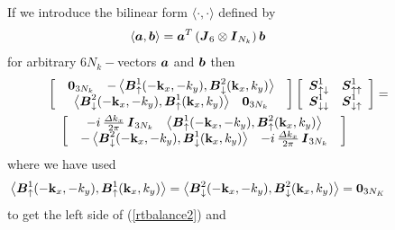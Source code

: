 \begin{figure}
{\begin{minipage} {140.0mm}
If we introduce the bilinear form $\langle \cdot, \cdot \rangle$ defined by
\[
\langle {\mbox{\boldmath$\mit a$\unboldmath}}, {\mbox{\boldmath$\mit b$\unboldmath}} \rangle= {\mbox{\boldmath$\mit a$\unboldmath}}^{T}\left({\mbox{\boldmath$\mit J$\unboldmath}}_6 \otimes 
{\mbox{\boldmath$\mit I$\unboldmath}}_{N_k}  \right) {\mbox{\boldmath$\mit b$\unboldmath}}
\]
for arbitrary $6 N_k-$vectors ${\mbox{\boldmath$\mit a$\unboldmath}}$ and  ${\mbox{\boldmath$\mit b$\unboldmath}}$ then
\begin{eqnarray} \label{rtbalance2}
\lefteqn{\left[{\begin{array}{c}\begin{array}{cc}{\bf 
0}_{3{N}_{k}}&-\left\langle{{\bmi B}_{ \uparrow }^{1}(-{\bf 
k}_{x},-{k}_{y}),{\bmi B}_{ \downarrow }^{2}({\bf 
k}_{x},{k}_{y})}\right\rangle\end{array}\\ 
\begin{array}{cc}\left\langle{{\bmi B}_{ \downarrow }^{2}(-{\bf 
k}_{x},-{k}_{y}),{\bmi B}_{ \uparrow }^{1}({\bf 
k}_{x},{k}_{y})}\right\rangle&{\bf 
0}_{3{N}_{k}}\end{array}\end{array}}\right]\left[{\begin{array}{cc}{\bmi 
S}^{1}_{ \uparrow \downarrow }&{\bmi S}^{1}_{ \uparrow \uparrow }\\ {\bmi S}^{1}_{ 
\downarrow \downarrow }&{\bmi S}^{1}_{ \downarrow \uparrow 
}\end{array}}\right]=}\nonumber\\
&&
\left[{\begin{array}{c}\begin{array}{cc}-i\,\frac{{\mit \Delta}k_x}{2 
\pi}\,{\bmi 
I}_{3{N}_{k}}&\left\langle{{\bmi B}_{ \uparrow }^{1}(-{\bf 
k}_{x},-{k}_{y}),{\bmi B}_{ \uparrow }^{2}({\bf 
k}_{x},{k}_{y})}\right\rangle\end{array}\\ 
\begin{array}{cc}-\left\langle{{\bmi B}_{ \downarrow }^{2}(-{\bf 
k}_{x},-{k}_{y}),{\bmi B}_{ \downarrow }^{1}({\bf 
k}_{x},{k}_{y})}\right\rangle&-i\,\frac{{\mit \Delta}k_x}{2 \pi}\,{\bmi 
I}_{3{N}_{k}}\end{array}\end{array}}\right] 
\end{eqnarray} 
where we have used
\[
\left\langle{{\mbox{\boldmath$\mit B$\unboldmath}}_{ \uparrow }^{1}(-{\bf k}_{x},-{k}_{y}),{\mbox{\boldmath$\mit B$\unboldmath}}_{ \uparrow 
}^{1}({\bf k}_{x},{k}_{y})}\right\rangle=\left\langle{{\mbox{\boldmath$\mit B$\unboldmath}}_{ \downarrow 
}^{2}(-{\bf k}_{x},-{k}_{y}),{\mbox{\boldmath$\mit B$\unboldmath}}_{ \downarrow 
}^{2}({\bf k}_{x},{k}_{y})}\right\rangle={\bf 0}_{3{N}_{K}}
\] 
to get the left side of (\ref{rtbalance2}) and

\vspace{6mm}
\end{minipage}
}
\end{figure}
